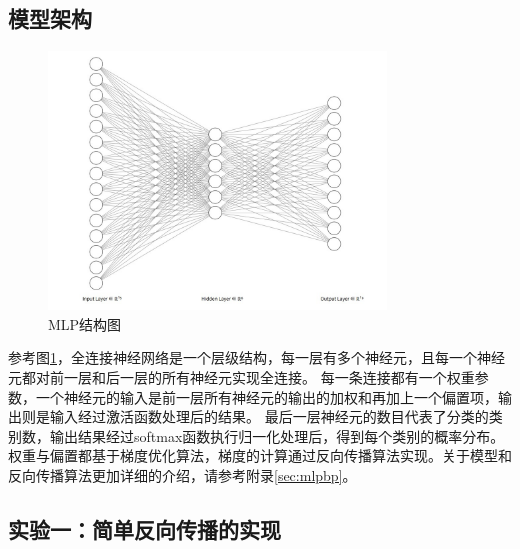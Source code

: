 \documentclass[12pt,a4paper]{article}
\begin{document}
\subsection{模型架构}
\begin{figure}[H]
    \centering
    \includegraphics[width=0.8\textwidth]{../images/1.jpg}
    \caption{MLP结构图}
    \label{fig:mlpstructure}
\end{figure}
参考图\ref{fig:mlpstructure}，全连接神经网络是一个层级结构，每一层有多个神经元，且每一个神经元都对前一层和后一层的所有神经元实现全连接。
每一条连接都有一个权重参数，一个神经元的输入是前一层所有神经元的输出的加权和再加上一个偏置项，输出则是输入经过激活函数处理后的结果。
最后一层神经元的数目代表了分类的类别数，输出结果经过softmax函数执行归一化处理后，得到每个类别的概率分布。权重与偏置都基于梯度优化算法，梯度的计算通过反向传播算法实现。关于模型和反向传播算法更加详细的介绍，请参考附录\ref{sec:mlpbp}。
\subsection{实验一：简单反向传播的实现}
\end{document}
